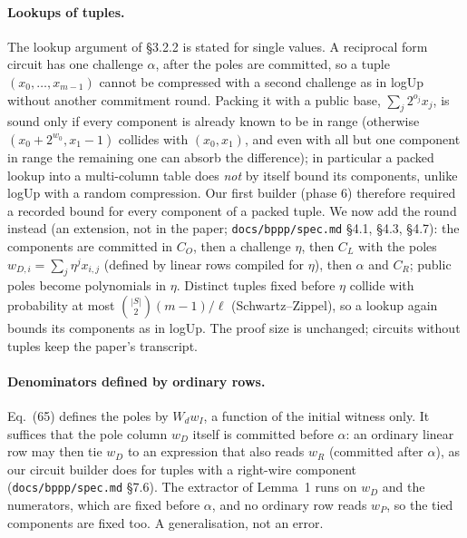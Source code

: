 \documentclass[11pt,a4paper]{article}
\begin{document}
\paragraph{Lookups of tuples.} The lookup argument of \S3.2.2 is stated for single values. A
reciprocal form circuit has one challenge $\alpha$, after the poles are committed, so a tuple
$(x_0, \dots, x_{m-1})$ cannot be compressed with a second challenge as in logUp without another
commitment round. Packing it with a public base, $\sum_j 2^{o_j} x_j$, is sound only if every
component is already known to be in range (otherwise $(x_0 + 2^{w_0}, x_1 - 1)$ collides with
$(x_0, x_1)$, and even with all but one component in range the remaining one can absorb the
difference); in particular a packed lookup into a multi-column table does \emph{not} by itself
bound its components, unlike logUp with a random compression. Our first builder (phase 6)
therefore required a recorded bound for every component of a packed tuple. We now add the
round instead (an extension, not in the paper; \texttt{docs/bppp/spec.md} \S4.1, \S4.3, \S4.7):
the components are committed in $C_O$, then a challenge $\eta$, then $C_L$ with the poles
$w_{D,i} = \sum_j \eta^j x_{i,j}$ (defined by linear rows compiled for $\eta$), then $\alpha$ and
$C_R$; public poles become polynomials in $\eta$. Distinct tuples fixed before $\eta$ collide with
probability at most $\binom{|S|}{2}(m-1)/\ell$ (Schwartz--Zippel), so a lookup again bounds its
components as in logUp. The proof size is unchanged; circuits without tuples keep the paper's
transcript.

\paragraph{Denominators defined by ordinary rows.} Eq.~(65) defines the poles by $W_d w_I$, a
function of the initial witness only. It suffices that the pole column $w_D$ itself is committed
before $\alpha$: an ordinary linear row may then tie $w_D$ to an expression that also reads $w_R$
(committed after $\alpha$), as our circuit builder does for tuples with a right-wire component
(\texttt{docs/bppp/spec.md} \S7.6). The extractor of Lemma~1 runs on $w_D$ and the numerators,
which are fixed before $\alpha$, and no ordinary row reads $w_P$, so the tied components are fixed
too. A generalisation, not an error.
\end{document}
